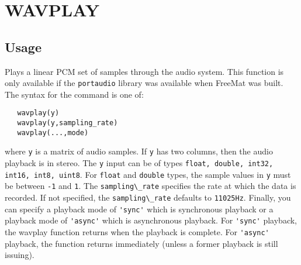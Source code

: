 \section{WAVPLAY}

\subsection{Usage}

Plays a linear PCM set of samples through the audio system.  This
function is only available if the \verb|portaudio| library was available
when FreeMat was built.  The syntax for the command is one of:
\begin{verbatim}
   wavplay(y)
   wavplay(y,sampling_rate)
   wavplay(...,mode)
\end{verbatim}
where \verb|y| is a matrix of audio samples.  If \verb|y| has two columns, then
the audio playback is in stereo.  The \verb|y| input can be of types 
\verb|float, double, int32, int16, int8, uint8|.  For \verb|float| and 
\verb|double| types, the sample values in \verb|y| must be between \verb|-1| and
\verb|1|.  The \verb|sampling\_rate| specifies the rate at which the data is 
recorded.  If not specified, the \verb|sampling\_rate| defaults to \verb|11025Hz|.
Finally, you can specify a playback mode of \verb|'sync'| which is synchronous
playback or a playback mode of \verb|'async'| which is asynchronous playback.
For \verb|'sync'| playback, the wavplay function returns when the playback is
complete.  For \verb|'async'| playback, the function returns immediately (unless
a former playback is still issuing).

